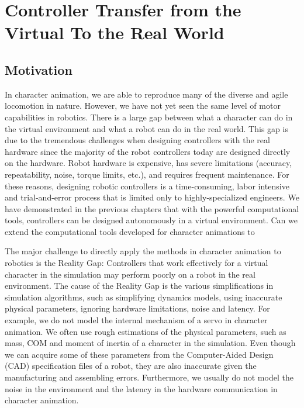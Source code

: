 \chapter{Controller Transfer from the Virtual To the Real World}
\section{Motivation}
In character animation, we are able to reproduce many of the diverse and agile locomotion in nature. However, we have not yet seen the same level of motor capabilities in robotics. There is a large gap between what a character can do in the virtual environment and what a robot can do in the real world. This gap is due to the tremendous challenges when designing controllers with the real hardware since the majority of the robot controllers today are designed directly on the hardware. Robot hardware is expensive, has severe limitations (accuracy, repeatability, noise, torque limits, etc.), and requires frequent maintenance. For these reasons, designing robotic controllers is a time-consuming, labor intensive and trial-and-error process that is limited only to highly-specialized engineers. We have demonstrated in the previous chapters that with the powerful computational tools, controllers can be designed autonomously in a virtual environment. Can we extend the computational tools developed for character animations to  

The major challenge to directly apply the methods in character animation to robotics is the Reality Gap: Controllers that work effectively for a virtual character in the simulation may perform poorly on a robot in the real environment. The cause of the Reality Gap is the various simplifications in simulation algorithms, such as simplifying dynamics models, using inaccurate physical parameters, ignoring hardware limitations, noise and latency. For example, we do not model the internal mechanism of a servo in character animation. We often use rough estimations of the physical parameters, such as mass, COM and moment of inertia of a character in the simulation. Even though we can acquire some of these parameters from the Computer-Aided Design (CAD) specification files of a robot, they are also inaccurate given the manufacturing and assembling errors. Furthermore, we usually do not model the noise in the environment and the latency in the hardware communication in character animation.

